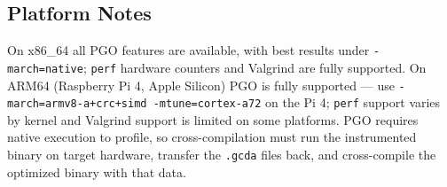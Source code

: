 \subsection{Platform Notes}

On x86\_64 all PGO features are available, with best results under
\texttt{-march=native}; \texttt{perf} hardware counters and Valgrind are fully
supported. On ARM64 (Raspberry Pi 4, Apple Silicon) PGO is fully supported ---
use \texttt{-march=armv8-a+crc+simd -mtune=cortex-a72} on the Pi 4; \texttt{perf}
support varies by kernel and Valgrind support is limited on some platforms.
PGO requires native execution to profile, so cross-compilation must run the
instrumented binary on target hardware, transfer the \texttt{.gcda} files
back, and cross-compile the optimized binary with that data.
